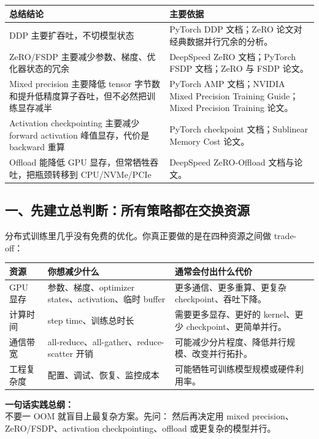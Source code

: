\begin{center}
{\small
\begin{tabular}{p{4.1cm}p{8.6cm}}
\hline
\textbf{总结结论} & \textbf{主要依据} \\
\hline
DDP 主要扩吞吐，不切模型状态 & PyTorch DDP 文档；ZeRO 论文对经典数据并行冗余的分析。 \\
ZeRO/FSDP 主要减少参数、梯度、优化器状态的冗余 & DeepSpeed ZeRO 文档；PyTorch FSDP 文档；ZeRO 与 FSDP 论文。 \\
Mixed precision 主要降低 tensor 字节数和提升低精度算子吞吐，但不必然把训练显存减半 & PyTorch AMP 文档；NVIDIA Mixed Precision Training Guide；Mixed Precision Training 论文。 \\
Activation checkpointing 主要减少 forward activation 峰值显存，代价是 backward 重算 & PyTorch checkpoint 文档；Sublinear Memory Cost 论文。 \\
Offload 能降低 GPU 显存，但常牺牲吞吐，把瓶颈转移到 CPU/NVMe/PCIe & DeepSpeed ZeRO-Offload 文档与论文。 \\
\hline
\end{tabular}
}
\end{center}

\subsection{一、先建立总判断：所有策略都在交换资源}

分布式训练里几乎没有免费的优化。你真正要做的是在四种资源之间做 trade-off：

\begin{center}
{\small
\begin{tabular}{p{3cm}p{4.5cm}p{5.4cm}}
\hline
\textbf{资源} & \textbf{你想减少什么} & \textbf{通常会付出什么代价} \\
\hline
GPU 显存 & 参数、梯度、optimizer states、activation、临时 buffer & 更多通信、更多重算、更复杂 checkpoint、吞吐下降。 \\
计算时间 & step time、训练总时长 & 需要更多显存、更好的 kernel、更少 checkpoint、更简单并行。 \\
通信带宽 & all-reduce、all-gather、reduce-scatter 开销 & 可能减少分片程度、降低并行规模、改变并行拓扑。 \\
工程复杂度 & 配置、调试、恢复、监控成本 & 可能牺牲可训练模型规模或硬件利用率。 \\
\hline
\end{tabular}
}
\end{center}

\begin{summarybox}
\textbf{一句话实践总纲：}\\
不要一 OOM 就盲目上最复杂方案。先问： 然后再决定用 mixed precision、ZeRO/FSDP、activation checkpointing、offload 或更复杂的模型并行。
\end{summarybox}

